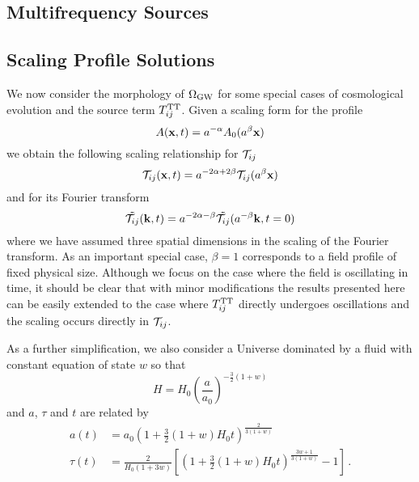 \documentclass{revtex4}
\begin{document}
\subsection{Multifrequency Sources}

\subsection{Scaling Profile Solutions}
We now consider the morphology of $\Omega_{\rm GW}$ for some special cases of cosmological evolution and the source term $T_{ij}^{{\rm TT}}$.
Given a scaling form for the profile
\begin{equation}
  A({\bf x},t) = a^{-\alpha} A_0(a^\beta{\bf x})
\end{equation}
we obtain the following scaling relationship for $\mathcal{T}_{ij}$
\begin{equation}
  \mathcal{T}_{ij}({\bf x},t) = a^{-2\alpha+2\beta}\mathcal{T}_{ij}(a^\beta{\bf x})
\end{equation}
and for its Fourier transform
\begin{equation}
  \tilde{\mathcal{T}_{ij}}({\bf k},t) = a^{-2\alpha-\beta}\tilde{\mathcal{T}_{ij}}(a^{-\beta}{\bf k},t=0)
\end{equation}
where we have assumed three spatial dimensions in the scaling of the Fourier transform.
As an important special case, $\beta=1$ corresponds to a field profile of fixed physical size.
Although we focus on the case where the field is oscillating in time, it should be clear that with minor modifications the results presented here can be easily extended to the case where $T_{ij}^{{\rm TT}}$ directly undergoes oscillations and the scaling occurs directly in $\mathcal{T}_{ij}$.

As a further simplification, we also consider a Universe dominated by a fluid with constant equation of state $w$ so that
\begin{equation}
  H = H_0 \left(\frac{a}{a_0}\right)^{-\frac{3}{2}(1+w)}
\end{equation}
and $a$, $\tau$ and $t$ are related by
\begin{subequations}
\begin{align}
  a(t)    &= a_0\left(1 + \frac{3}{2}(1+w)H_0t \right)^{\frac{2}{3(1+w)}}\\
  \tau(t) &= \frac{2}{H_0(1+3w)}\left[\left(1+\frac{3}{2}(1+w)H_0t\right)^{\frac{3w+1}{3(1+w)}} - 1 \right] \, .
\end{align}
\end{subequations}
\end{document}
